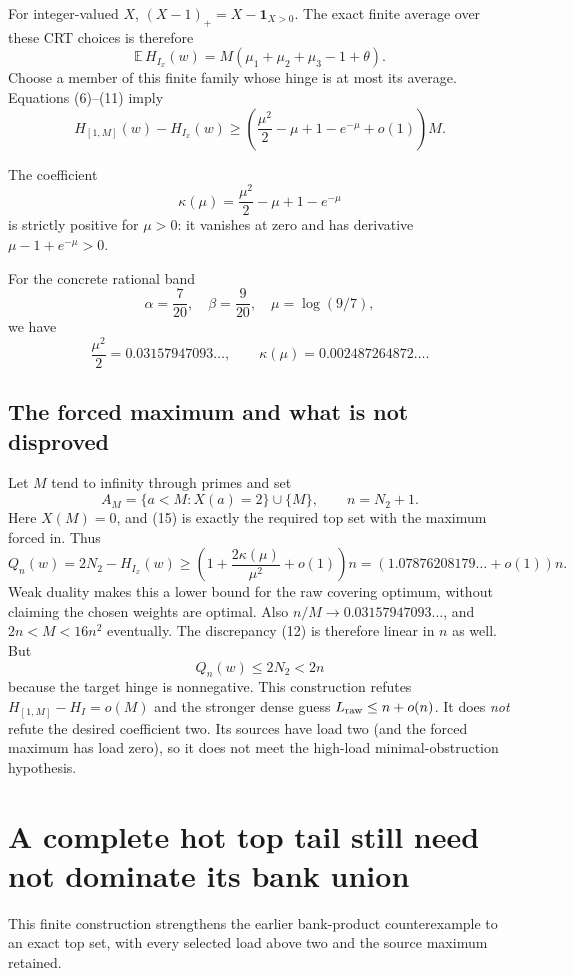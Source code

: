 \documentclass[11pt,a4paper]{article}
\newcommand{\raw}{L_{\rm raw}}
\newcommand{\ind}{\mathbf1}
\begin{document}
For integer-valued \(X\), \((X-1)_+=X-\ind_{X>0}\).
The exact finite average over these CRT choices is therefore
\[
 \boxed{\quad
 \mathbb E\,H_{I_x}(w)
 =M(\mu_1+\mu_2+\mu_3-1+\theta).
 \quad}
 \tag{11}
\]
Choose a member of this finite family whose hinge is at most its
average. Equations (6)--(11) imply
\[
 H_{[1,M]}(w)-H_{I_x}(w)
 \ge\left(\frac{\mu^2}{2}-\mu+1-e^{-\mu}+o(1)\right)M.
 \tag{12}
\]
\begin{samepage}
The coefficient
\[
 \kappa(\mu)=\frac{\mu^2}{2}-\mu+1-e^{-\mu}
 \tag{13}
\]
is strictly positive for \(\mu>0\): it vanishes at zero and has
derivative \(\mu-1+e^{-\mu}>0\).
\end{samepage}

For the concrete rational band
\[
 \alpha=\frac7{20},\quad\beta=\frac9{20},\quad\mu=\log(9/7),
\]
we have
\[
 \frac{\mu^2}{2}=0.03157947093\ldots,\qquad
 \kappa(\mu)=0.002487264872\ldots.
 \tag{14}
\]

\subsection*{The forced maximum and what is not disproved}
Let \(M\) tend to infinity through primes and set
\[
 A_M=\{a<M:X(a)=2\}\cup\{M\},\qquad n=N_2+1.
 \tag{15}
\]
Here \(X(M)=0\), and (15) is exactly the required top set with
the maximum forced in. Thus
\[
 Q_n(w)=2N_2-H_{I_x}(w)
 \ge\left(1+\frac{2\kappa(\mu)}{\mu^2}+o(1)\right)n
 =(1.07876208179\ldots+o(1))n.
 \tag{16}
\]
Weak duality makes this a lower bound for the raw covering optimum,
without claiming the chosen weights are optimal.
Also \(n/M\to0.03157947093\ldots\), and
\(2n<M<16n^2\) eventually.
The discrepancy (12) is therefore linear in \(n\) as well.
But
\[
 Q_n(w)\le2N_2<2n
\]
because the target hinge is nonnegative.
This construction refutes \(H_{[1,M]}-H_I=o(M)\) and the stronger
dense guess \(\raw\le n+o(n)\). It does \emph{not} refute
the desired coefficient two. Its sources have load two (and the forced maximum has load zero), so it does not meet the high-load minimal-obstruction hypothesis.

\section{A complete hot top tail still need not dominate its bank union}
This finite construction strengthens the earlier bank-product
counterexample to an exact top set, with every selected load above
two and the source maximum retained.
\end{document}
